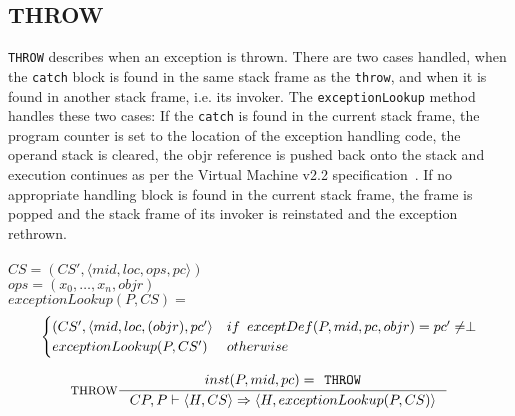 \subsection{THROW}
\texttt{THROW} describes when an exception is thrown. There are two cases handled, when the \texttt{catch} block is found in the same stack frame as the \texttt{throw}, and when it is found in another stack frame, i.e. its invoker. The \texttt{exceptionLookup} method handles these two cases: If the \texttt{catch} is found in the current stack frame, the program counter is set to the location of the exception handling code, the operand stack is cleared, the objr reference is pushed back onto the stack and execution continues as per the \jc Virtual Machine v2.2 specification~\cite[JcvmSpec p. 151]{jcvm}. If no appropriate handling block is found in the current stack frame, the frame is popped and the stack frame of its invoker is reinstated and the exception rethrown.\\\\
$CS = (CS', \langle mid, loc, ops, pc \rangle)$ \\ 
$ops = (x_0, \ldots, x_n, objr)$\vspace{5px} \\
$exceptionLookup(P, CS) = $ \vspace{-10px} \\
\[
\begin{cases}
  (CS', \langle mid, loc, (objr), pc' \rangle  & if \hspace{5px} exceptDef(P, mid, pc, objr) = pc' \neq \perp\\
  exceptionLookup(P, CS') & otherwise
\end{cases}
\]

$$\inference[THROW]{
inst(P,mid,pc) = \texttt{THROW} }
{CP, P \vdash \langle H, CS \rangle \Rightarrow \langle H, exceptionLookup(P,CS)\rangle}$$